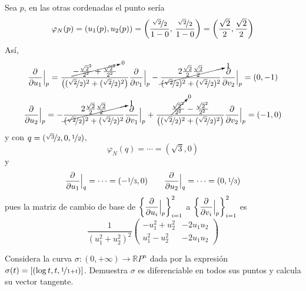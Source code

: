 \begin{sol}
\begin{enumerate}
        Sea $p$, en las otras cordenadas el punto ser\'ia 
        $$\varphi_N(p)=(u_1(p), u_2(p))=\left(\dfrac{\nicefrac{\sqrt{2}}{2}}{1-0}, \, \dfrac{\nicefrac{\sqrt{2}}{2}}{1-0}\right) = \left( \dfrac{\sqrt{2}}{2}, \dfrac{\sqrt{2}}{2}\right)$$
        As\'i, 
        $$\dfrac{\partial^{} }{\partial u_1} \Big|_p = \dfrac{\cancelto{0}{-\frac{\sqrt{2}^2}{2^2}+\frac{\sqrt{2}^2}{2^2}}}{\left( (\nicefrac{\sqrt{2}}{2})^2+(\nicefrac{\sqrt{2}}{2})^2 \right)} \dfrac{\partial^{} }{\partial v_1} \Big|_p - \cancelto{1}{\dfrac{2\frac{\sqrt{2}}{2}\frac{\sqrt{2}}{2}}{(\nicefrac{\sqrt{2}}{2})^2+(\nicefrac{\sqrt{2}}{2})^2}} \dfrac{\partial^{} }{\partial v_2} \Big|_p =(0,-1)$$
        $$\dfrac{\partial^{} }{\partial u_2} \Big|_p = - \cancelto{1}{\dfrac{2\frac{\sqrt{2}}{2}\frac{\sqrt{2}}{2}}{(\nicefrac{\sqrt{2}}{2})^2+(\nicefrac{\sqrt{2}}{2})^2}} \dfrac{\partial^{} }{\partial v_1} \Big|_p + \dfrac{\cancelto{0}{\frac{\sqrt{2}^2}{2^2}}-\frac{\sqrt{2}^2}{2^2}}{\left( (\nicefrac{\sqrt{2}}{2})^2+(\nicefrac{\sqrt{2}}{2})^2 \right)} \dfrac{\partial^{} }{\partial v_2} \Big|_p = (-1,0)$$
        y con $q=(\nicefrac{\sqrt{3}}{2}, 0, \nicefrac{1}{2})$, 
        $$\varphi_N(q) = \cdots = (\sqrt{3}, 0) $$
        y 
        $$\dfrac{\partial^{} }{\partial u_1} \Big|_q = \cdots = (-\nicefrac{1}{3},0) \qquad \dfrac{\partial^{} }{\partial u_2} \Big|_q = \cdots = (0, \nicefrac{1}{3})$$
        pues la matriz de cambio de base de $\left\{ \dfrac{\partial^{} }{\partial u_i} \Big|_p\right\}_{i=1}^2$ a $\left\{ \dfrac{\partial^{} }{\partial v_i} \Big|_p\right\}_{i=1}^2$ es
        $$\dfrac{1}{(u_1^2+u_2^2)^2} \begin{pmatrix}
            -u_1^2+u_2^2 & -2u_1u_2 \\  u_1^2-u_2^2& -2u_1u_2
        \end{pmatrix}$$
    \end{enumerate}
\end{sol}
\begin{ejer}
    [2.6] Considera la curva $\sigma : (0, +\infty) \to \mathbb R P^n$  dada por la expresi\'on $\sigma(t) = [(\log t, t, \nicefrac{1}{1+t})]$. Demuestra $\sigma$ es diferenciable en todos sus puntos y calcula su vector tangente.
\end{ejer}
